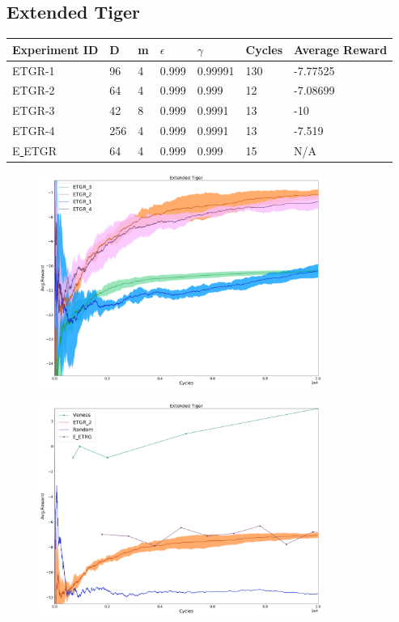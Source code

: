 \documentclass{article}
\theoremstyle{definition}
\newtheorem{primary statistics}[definition]{Primary Statistics}
\newtheorem{auxiliary statistics}[definition]{Auxiliary Statistics}
\begin{document}
\newpage

\subsection{Extended Tiger}
 \begin{tabular}{|l|l|l|l|l|l|l|}
 \hline \centering
 Experiment ID& D & m & $\epsilon$ & $\gamma$ & Cycles & Average Reward \\ \hline
ETGR-1 & 96        & 4           & 0.999       & 0.99991           & 130    & -7.77525        \\ \hline
ETGR-2 & 64        & 4           & 0.999       & 0.999             & 12     & -7.08699       \\ \hline
ETGR-3 & 42        & 8           & 0.999       & 0.9991            & 13     & -10             \\ \hline
ETGR-4 & 256       & 4           & 0.999       & 0.9991            & 13     & -7.519  \\ \hline 
E\underline{ }ETGR & 64       & 4           & 0.999       & 0.999            & 15     & N/A  \\ \hline    
\end{tabular}



 \begin{figure}[h]
 \centering
    \includegraphics[width=9.3cm]{4_Extended_Tiger}
\end{figure}

 \begin{figure}[h]
 \centering
    \includegraphics[width=9.3cm]{Extended_Tiger}
\end{figure}
\end{document}
